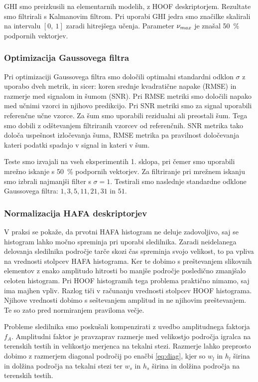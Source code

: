 GHI smo preizkusili na elementarnih modelih, z HOOF deskriptorjem. Rezultate smo filtrirali s Kalmanovim filtrom. Pri uporabi GHI jedra smo značilke skalirali na intervalu $[0,~1]$ zaradi hitrejšega učenja. Parameter $\nu_{max}$ je znašal \SI{50}{\%} podpornih vektorjev. 






\subsubsection{Optimizacija Gaussovega filtra}
Pri optimizaciji Gaussovega filtra smo določili optimalni standardni odklon $\sigma$ z uporabo dveh metrik, in sicer: koren srednje kvadratične napake (RMSE) in razmerje med signalom in šumom (SNR). Pri RMSE metriki smo določili napako med učnimi vzorci in njihovo predikcijo. Pri SNR metriki smo za signal uporabili referenčne učne vzorce. Za šum smo uporabili rezidualni ali preostali šum. Tega smo dobili z odštevanjem filtriranih vzorcev od referenčnih. SNR metrika tako določa uspešnost izločevanja šuma, RMSE metrika pa pravilnost določevanja kateri podatki spadajo v signal in kateri v šum.


Teste smo izvajali na vseh eksperimentih 1. sklopa, pri čemer smo uporabili \nurbf mrežno iskanje s \SI{50}{\%} podpornih vektorjev. Za filtriranje pri mrežnem iskanju smo izbrali najmanjši filter s $\sigma = 1$. Testirali smo naslednje standardne odklone Gaussovega filtra: $1, 3, 5, 11, 21, 31$ in $51$. 




\subsubsection{Normalizacija HAFA deskriptorjev}
V praksi se pokaže, da prvotni HAFA histogram ne deluje zadovoljivo, saj se histogram lahko močno spreminja pri uporabi sledilnika. Zaradi neidelanega delovanja sledilnika področje tarče skozi čas spreminja svojo velikost, to pa vpliva na vrednosti stolpcev HAFA histograma. Ker te dobimo s preštevanjem slikovnih elementov z enako amplitudo hitrosti bo manjše področje posledično zmanjšalo celoten histogram. Pri HOOF histogramih tega problema praktično nimamo, saj ima majhen vpliv. Razlog tiči v računanju vrednosti stolpcev HOOF histograma. Njihove vrednosti dobimo s seštevanjem amplitud in ne njihovim preštevanjem. Te so zato pred normiranjem praviloma večje.

Probleme sledilnika smo poskušali kompenzirati z uvedbo amplitudnega faktorja $f_A$. Amplitudni faktor je pravzaprav razmerje med velikostjo področja igralca na terenskih testih in velikostjo merjenca na tekalni stezi. Razmerje lahko preprosto dobimo z razmerjem diagonal področij po enačbi \eqref{eq:diag}, kjer so $w_l$ in $h_l$ širina in dolžina področja na tekalni stezi ter $w_s$ in $h_s$ širina in dolžina področja na terenskih testih.

